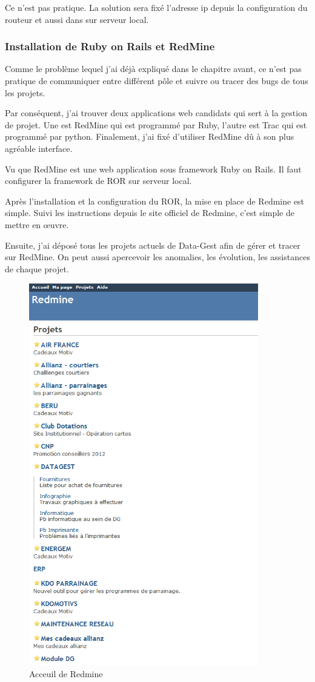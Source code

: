 Ce n'est pas pratique. La solution sera fixé l'adresse ip depuis la configuration du routeur et aussi dans sur serveur local.



\subsubsection{Installation de Ruby on Rails et RedMine}
Comme le problème lequel j'ai déjà expliqué dans le chapitre avant, ce n'est pas pratique de communiquer entre différent pôle  et suivre ou tracer des bugs de tous les projets. 

Par conséquent, j'ai trouver deux applications web candidats qui sert à la gestion de projet. Une est RedMine qui est programmé par Ruby, l'autre est Trac qui est programmé par python. Finalement, j'ai fixé d'utiliser RedMine dû à son plus agréable interface.  

Vu que RedMine est une web application sous framework Ruby on Rails. Il faut configurer la framework de ROR sur serveur local. 

Après l'installation et la configuration du ROR, la mise en place de Redmine est simple. Suivi les instructions depuis le site officiel de Redmine, c'est simple de mettre en œuvre. 

Ensuite, j'ai déposé tous les projets actuels de Data-Gest afin de gérer et tracer sur RedMine. On peut aussi apercevoir les anomalies, les évolution, les assistances de chaque projet.
\begin{figure}[hbtp]
\centering
\includegraphics[width=10cm]{body/images/redmine-accueil.PNG}
\caption{Acceuil de Redmine}
\end{figure}



